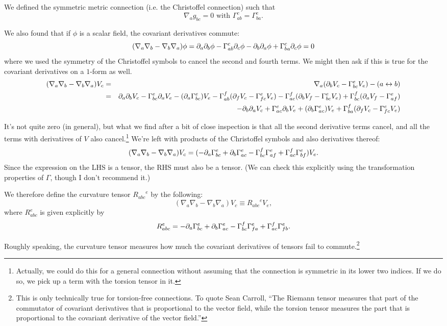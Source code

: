 We defined the symmetric metric connection (i.e. the Christoffel connection) such that
$$\nabla_a g_{bc}=0\text{ with } \Gamma^c_{ab}=\Gamma^{c}_{ba}.$$

We also found that if $\phi$ is a scalar field, the covariant derivatives commute:
$$(\nabla_a \nabla_b - \nabla_b \nabla_a)\phi = \partial_a \partial_b \phi - \Gamma^c_{ab} \partial_c \phi - \partial_b \partial_a \phi+ \Gamma^c_{ba}\partial_c\phi =0$$
where we used the symmetry of the Christoffel symbols to cancel the second and fourth terms.
We might then ask if this is true for the covariant derivatives on a $1$-form as well.
\begin{eqnarray*}
(\nabla_a \nabla_b - \nabla_b \nabla_a)V_c &=&
\nabla_a(\partial_b V_c - \Gamma^e_{bc} V_e) - (a\leftrightarrow b)\\
&=&\partial_a\partial_b V_c - \Gamma^e_{bc} \partial_a V_e - (\partial_a \Gamma^e_{bc})V_e - \Gamma^f_{ab} (\partial_f V_c- \Gamma^e_{fc} V_e) -\Gamma^f_{ac}(\partial_b V_f - \Gamma^e_{bc}V_e) +\Gamma^f_{bc}(\partial_a V_f -\Gamma^e_{af})\\
&&-\partial_b\partial_a V_c + \Gamma^e_{ac}\partial_b V_e + (\partial_b \Gamma^e_{ac})V_e +\Gamma^f_{ba}(\partial_f V_c - \Gamma^e_{fc} V_e)
\end{eqnarray*}

It's not quite zero (in general), but what we find after a bit of close inspection is that all the second derivative terms cancel, and all the terms with derivatives of $V$ also cancel.\footnote{Actually, we could do this for a general connection without assuming that the connection is symmetric in its lower two indices. If we do so, we pick up a term with the torsion tensor in it.} We're left with products of the Christoffel symbols and also derivatives thereof:
$$(\nabla_a\nabla_b - \nabla_b \nabla_a)V_c=(-\partial_a \Gamma^e_{bc}+\partial_b \Gamma^e_{ac} - \Gamma^f_{bc} \Gamma^e_{af}+\Gamma^f_{ac} \Gamma^e_{bf}) V_e.$$
Since the expression on the LHS is a tensor, the RHS must also be a tensor. (We can check this explicitly using the transformation properties of $\Gamma$, though I don't recommend it.)

\begin{defn}
We therefore define the curvature tensor ${R_{abc}}^e$ by the following:
$$(\nabla_a \nabla_b - \nabla_b \nabla_a)V_c\equiv {R_{abc}}^e V_e,$$
where $R_{abc}^e$ is given explicitly by
$$R_{abc}^e = -\partial_a \Gamma^e_{bc} +\partial_b \Gamma^e_{ac}-\Gamma^f_{bc} \Gamma^e_{fa}+\Gamma^f_{ac} \Gamma^e_{fb}.$$

Roughly speaking, the curvature tensor measures how much the covariant derivatives of tensors fail to commute.\footnote{This is only technically true for torsion-free connections. To quote Sean Carroll, ``The Riemann tensor measures that part of the commutator of covariant derivatives that is proportional to the vector field, while the torsion tensor measures the part that is proportional to the covariant derivative of the vector field.''}
\end{defn}

